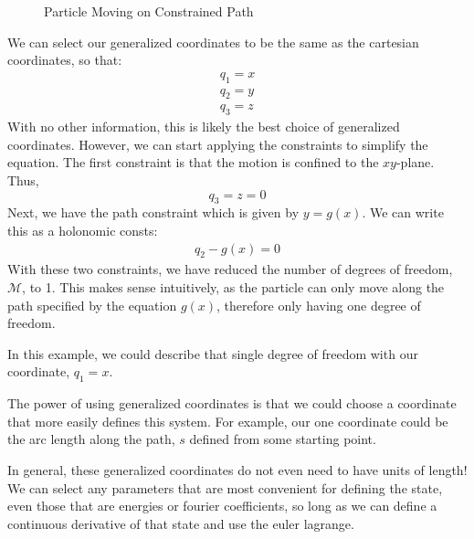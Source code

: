 \begin{example}
\begin{figure}[H]

    \caption{Particle Moving on Constrained Path}
    \label{fig:constrainted path}
\end{figure}
We can select our generalized coordinates to be the same as the cartesian coordinates, so that:
\begin{gather}
    q_1=x\\q_2=y\\q_3=z
\end{gather}
With no other information, this is likely the best choice of generalized coordinates. However, we can start applying the constraints to simplify the equation. The first constraint is that the motion is confined to the $xy$-plane. Thus, 
$$q_3=z=0$$
Next, we have the path constraint which is given by $y=g(x)$. We can write this as a \glspl{holonomic const}:
\begin{gather}
    q_2-g(x)=0
\end{gather}
With these two constraints, we have reduced the number of degrees of freedom, $\mathcal{M}$, to 1. This makes sense intuitively, as the particle can only move along the path specified by the equation $g(x)$, therefore only having one degree of freedom.

In this example, we could describe that single degree of freedom with our coordinate, $q_1=x$.

The power of using generalized coordinates is that we could choose a coordinate that more easily defines this system. For example, our one coordinate could be the arc length along the path, $s$ defined from some starting point.
\end{example}

In general, these generalized coordinates do not even need to have units of length! We can select any parameters that are most convenient for defining the state, even those that are energies or fourier coefficients, so long as we can define a continuous derivative of that state and use the \gls{euler lagrange}.


